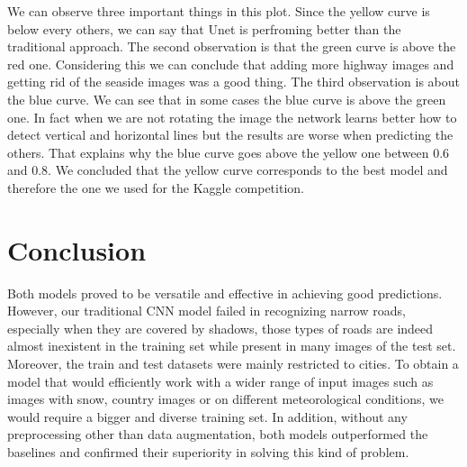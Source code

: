\documentclass[10pt,conference,compsocconf]{IEEEtran}
\begin{document}
	
	We can observe three important things in this plot. Since the yellow curve is below every others, we can say that Unet is perfroming better than the traditional approach. The second observation is that the green curve is above the red one. Considering this we can conclude that adding more highway images and getting rid of the seaside images was a good thing. The third observation is about the blue curve. We can see that in some cases the blue curve is above the green one. In fact when we are not rotating the image the network learns better how to detect vertical and horizontal lines but the results are worse when predicting the others. That explains why the blue curve goes above the yellow one between 0.6 and 0.8. We concluded that the yellow curve corresponds to the best model and therefore the one we used for the Kaggle competition.
	
\section{Conclusion}
\label{sec:conclusion}
Both models proved to be versatile and effective in achieving good predictions. However, our traditional CNN model failed in recognizing narrow roads, especially when they are covered by shadows, those types of roads are indeed almost inexistent in the training set while present in many images of the test set. Moreover, the train and test datasets were mainly restricted to cities. To obtain a model that would efficiently work with a wider range of input images such as images with snow, country images or on different meteorological conditions, we would require a bigger and diverse training set. In addition, without any preprocessing other than data augmentation, both models outperformed the baselines and confirmed their superiority in solving this kind of problem.




\end{document}
